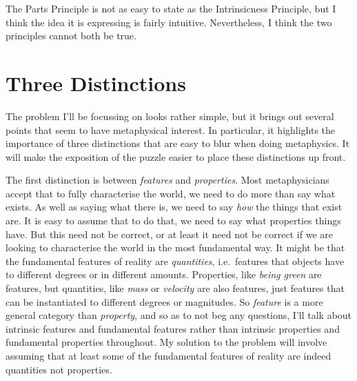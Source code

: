 \documentclass[
  10pt,
  letterpaper,
  DIV=11,
  numbers=noendperiod,
  twoside]{scrartcl}
\begin{document}
The Parts Principle is not as easy to state as the Intrinsicness
Principle, but I think the idea it is expressing is fairly intuitive.
Nevertheless, I think the two principles cannot both be true.

\section{Three Distinctions}\label{three-distinctions}

The problem I'll be focussing on looks rather simple, but it brings out
several points that seem to have metaphysical interest. In particular,
it highlights the importance of three distinctions that are easy to blur
when doing metaphysics. It will make the exposition of the puzzle easier
to place these distinctions up front.

The first distinction is between \emph{features} and \emph{properties}.
Most metaphysicians accept that to fully characterise the world, we need
to do more than say what exists. As well as saying what there is, we
need to say \emph{how} the things that exist are. It is easy to assume
that to do that, we need to say what properties things have. But this
need not be correct, or at least it need not be correct if we are
looking to characterise the world in the most fundamental way. It might
be that the fundamental features of reality are \emph{quantities},
i.e.~features that objects have to different degrees or in different
amounts. Properties, like \emph{being green} are features, but
quantities, like \emph{mass} or \emph{velocity} are also features, just
features that can be instantiated to different degrees or magnitudes. So
\emph{feature} is a more general category than \emph{property}, and so
as to not beg any questions, I'll talk about intrinsic features and
fundamental features rather than intrinsic properties and fundamental
properties throughout. My solution to the problem will involve assuming
that at least some of the fundamental features of reality are indeed
quantities not properties.
\end{document}
